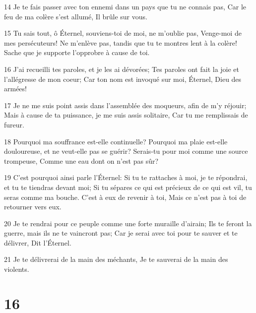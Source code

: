 \par 14 Je te fais passer avec ton ennemi dans un pays que tu ne connais pas, Car le feu de ma colère s'est allumé, Il brûle sur vous.
\par 15 Tu sais tout, ô Éternel, souviens-toi de moi, ne m'oublie pas, Venge-moi de mes persécuteurs! Ne m'enlève pas, tandis que tu te montres lent à la colère! Sache que je supporte l'opprobre à cause de toi.
\par 16 J'ai recueilli tes paroles, et je les ai dévorées; Tes paroles ont fait la joie et l'allégresse de mon coeur; Car ton nom est invoqué sur moi, Éternel, Dieu des armées!
\par 17 Je ne me suis point assis dans l'assemblée des moqueurs, afin de m'y réjouir; Mais à cause de ta puissance, je me suis assis solitaire, Car tu me remplissais de fureur.
\par 18 Pourquoi ma souffrance est-elle continuelle? Pourquoi ma plaie est-elle douloureuse, et ne veut-elle pas se guérir? Serais-tu pour moi comme une source trompeuse, Comme une eau dont on n'est pas sûr?
\par 19 C'est pourquoi ainsi parle l'Éternel: Si tu te rattaches à moi, je te répondrai, et tu te tiendras devant moi; Si tu sépares ce qui est précieux de ce qui est vil, tu seras comme ma bouche. C'est à eux de revenir à toi, Mais ce n'est pas à toi de retourner vers eux.
\par 20 Je te rendrai pour ce peuple comme une forte muraille d'airain; Ils te feront la guerre, mais ils ne te vaincront pas; Car je serai avec toi pour te sauver et te délivrer, Dit l'Éternel.
\par 21 Je te délivrerai de la main des méchants, Je te sauverai de la main des violents.

\chapter{16}

